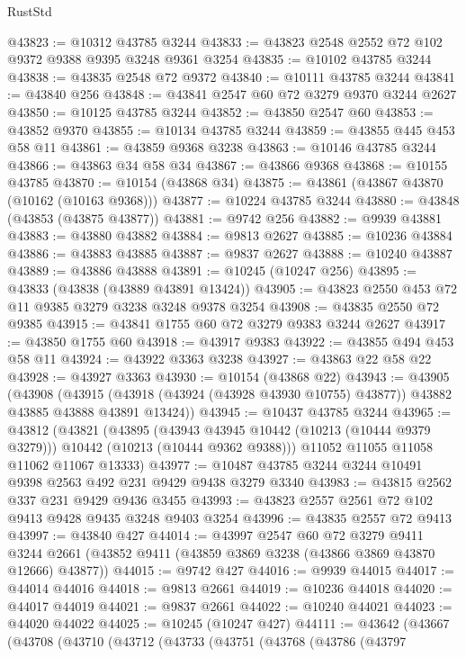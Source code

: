 \begin{lexlean}{RustStd}
\begin{coremodule}
@43823 := @10312 @43785 @3244
@43833 := @43823 @2548 @2552 @72 @102 @9372 @9388 @9395 @3248 @9361 @3254
@43835 := @10102 @43785 @3244
@43838 := @43835 @2548 @72 @9372
@43840 := @10111 @43785 @3244
@43841 := @43840 @256
@43848 := @43841 @2547 @60 @72 @3279 @9370 @3244 @2627
@43850 := @10125 @43785 @3244
@43852 := @43850 @2547 @60
@43853 := @43852 @9370
@43855 := @10134 @43785 @3244
@43859 := @43855 @445 @453 @58 @11
@43861 := @43859 @9368 @3238
@43863 := @10146 @43785 @3244
@43866 := @43863 @34 @58 @34
@43867 := @43866 @9368
@43868 := @10155 @43785
@43870 := @10154 (@43868 @34)
@43875 := @43861 (@43867 @43870 (@10162 (@10163 @9368)))
@43877 := @10224 @43785 @3244
@43880 := @43848 (@43853 (@43875 @43877))
@43881 := @9742 @256
@43882 := @9939 @43881
@43883 := @43880 @43882
@43884 := @9813 @2627
@43885 := @10236 @43884
@43886 := @43883 @43885
@43887 := @9837 @2627
@43888 := @10240 @43887
@43889 := @43886 @43888
@43891 := @10245 (@10247 @256)
@43895 := @43833 (@43838 (@43889 @43891 @13424))
@43905 := @43823 @2550 @453 @72 @11 @9385 @3279 @3238 @3248 @9378 @3254
@43908 := @43835 @2550 @72 @9385
@43915 := @43841 @1755 @60 @72 @3279 @9383 @3244 @2627
@43917 := @43850 @1755 @60
@43918 := @43917 @9383
@43922 := @43855 @494 @453 @58 @11
@43924 := @43922 @3363 @3238
@43927 := @43863 @22 @58 @22
@43928 := @43927 @3363
@43930 := @10154 (@43868 @22)
@43943 := @43905
    (@43908
      (@43915 (@43918 (@43924 (@43928 @43930 @10755) @43877)) @43882 @43885 @43888 @43891 @13424))
@43945 := @10437 @43785 @3244
@43965 := @43812
    (@43821
      (@43895
        (@43943 @43945 @10442 (@10213 (@10444 @9379 @3279)))
        @10442
        (@10213 (@10444 @9362 @9388)))
      @11052
      @11055
      @11058
      @11062
      @11067
      @13333)
@43977 := @10487 @43785 @3244 @3244 @10491 @9398 @2563 @492 @231 @9429 @9438 @3279 @3340
@43983 := @43815 @2562 @337 @231 @9429 @9436 @3455
@43993 := @43823 @2557 @2561 @72 @102 @9413 @9428 @9435 @3248 @9403 @3254
@43996 := @43835 @2557 @72 @9413
@43997 := @43840 @427
@44014 := @43997
    @2547
    @60
    @72
    @3279
    @9411
    @3244
    @2661
    (@43852 @9411 (@43859 @3869 @3238 (@43866 @3869 @43870 @12666) @43877))
@44015 := @9742 @427
@44016 := @9939 @44015
@44017 := @44014 @44016
@44018 := @9813 @2661
@44019 := @10236 @44018
@44020 := @44017 @44019
@44021 := @9837 @2661
@44022 := @10240 @44021
@44023 := @44020 @44022
@44025 := @10245 (@10247 @427)
@44111 := @43642
    (@43667
      (@43708
        (@43710
          (@43712
            (@43733
              (@43751
                (@43768
                  (@43786
                    (@43797

\end{coremodule}
\end{lexlean}
